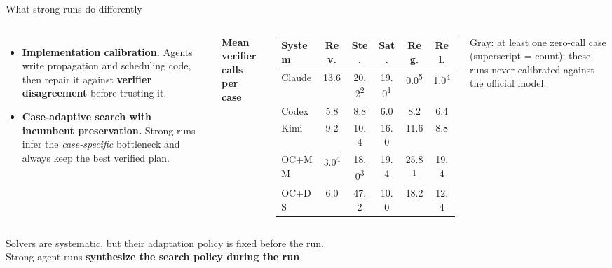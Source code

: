\documentclass[aspectratio=169,11pt]{beamer}
\newcommand{\srcnote}[1]{{\tiny\color{abgray}#1\par}}
\newcommand{\cardtitle}[2][abnavy]{{\small\bfseries\color{#1}#2\par}\vspace{0.15em}}
\begin{document}
\begin{frame}{What strong runs do differently}
  \begin{columns}[c]
      \begin{itemize}\setlength{\itemsep}{1.1em}
        \item \textbf{Implementation calibration.} Agents write propagation and scheduling code, then repair it against \textbf{verifier disagreement} before trusting it.
        \item \textbf{Case-adaptive search with incumbent preservation.} Strong runs infer the \emph{case-specific} bottleneck and always keep the best verified plan.
      \end{itemize}
      \cardtitle{Mean verifier calls per case}
      {\scriptsize
      \setlength{\tabcolsep}{2.5pt}
      \begin{tabular}{lccccc}
        \toprule
        System & Rev. & Ste. & Sat. & Reg. & Rel. \\
        \midrule
        Claude & 13.6 & \cellcolor{abgray!18}20.2\textsuperscript{2} & \cellcolor{abgray!18}19.0\textsuperscript{1} & \cellcolor{abgray!18}0.0\textsuperscript{5} & \cellcolor{abgray!18}1.0\textsuperscript{4} \\
        Codex & 5.8 & 8.8 & 6.0 & 8.2 & 6.4 \\
        Kimi & 9.2 & 10.4 & 16.0 & 11.6 & 8.8 \\
        OC+MM & \cellcolor{abgray!18}3.0\textsuperscript{4} & \cellcolor{abgray!18}18.0\textsuperscript{3} & 19.4 & \cellcolor{abgray!18}25.8\textsuperscript{1} & 19.4 \\
        OC+DS & 6.0 & 47.2 & 10.0 & 18.2 & 12.4 \\
        \bottomrule
      \end{tabular}}
      \par\vspace{0.5em}
      \srcnote{Gray: at least one zero-call case (superscript = count); these runs never calibrated against the official model.}
  \end{columns}
  \vspace{1.0em}
  \centering
  {\small Solvers are systematic, but their adaptation policy is fixed before the run.\\[0.3em]
  Strong agent runs \textbf{synthesize the search policy during the run}.}
\end{frame}
\end{document}
